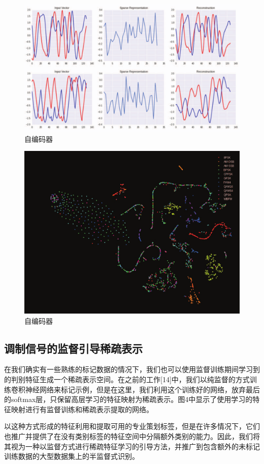 \begin{figure}[!h]
	\centering
	\includegraphics[scale=0.2]{figures/chapter_3/examples_cae}
	\caption{自编码器}	\label{fig_3_2}
\end{figure}
\begin{figure}[!h]
	\centering
	\includegraphics[scale=0.2]{figures/chapter_3/cae_fea}
	\caption{自编码器}	\label{fig_3_2}
\end{figure}

\subsection{调制信号的监督引导稀疏表示}
在我们确实有一些熟练的标记数据的情况下，我们也可以使用监督训练期间学习到的判别特征生成一个稀疏表示空间。在之前的工作[14]中，我们以纯监督的方式训练卷积神经网络来标记示例，但是在这里，我们利用这个训练好的网络，放弃最后的softmax层，只保留高层学习的特征映射为稀疏表示。图4中显示了使用学习的特征映射进行有监督训练和稀疏表示提取的网络。\par
以这种方式形成的特征利用和提取可用的专业策划标签，但是在许多情况下，它们也推广并提供了在没有类别标签的特征空间中分隔额外类别的能力。因此，我们将其视为一种以监督方式进行稀疏特征学习的引导方法，并推广到包含额外的未标记训练数据的大型数据集上的半监督式识别。\par

